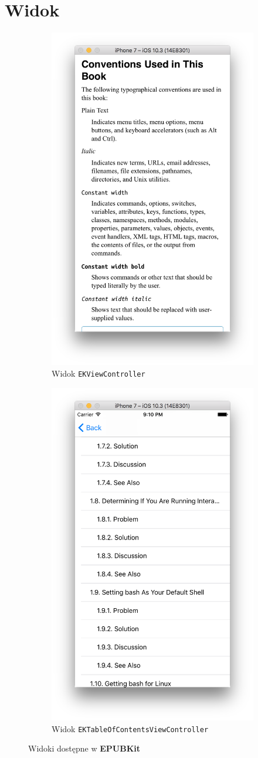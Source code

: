 \section{Widok}

\begin{figure}[ht!]
\centering
\begin{subfigure}{.5\textwidth}
  \centering
  \includegraphics[width=.4\linewidth]{images/chapter-4-image-4-epubkit-view-scroll.png}
  \caption{Widok \texttt{EKViewController}}
  \label{chapter-4-image-4-epubkit-view-scroll}
\end{subfigure}%
\begin{subfigure}{.5\textwidth}
  \centering
  \includegraphics[width=.4\linewidth]{images/chapter-4-image-5-epubkit-view-toc.png}
  \caption{Widok \texttt{EKTableOfContentsViewController}}
  \label{chapter-4-image-5-epubkit-view-toc}
\end{subfigure}
\caption{Widoki dostępne w \textbf{EPUBKit}}
\label{chapter-4-image-4-5}
\end{figure}

